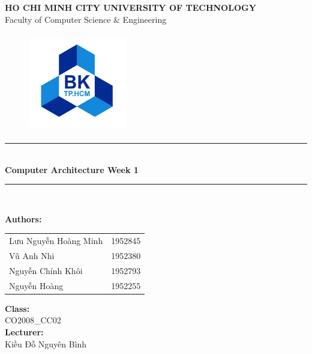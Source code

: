 \documentclass[12pt,a4paper]{article}
\newcommand\HRule{\rule{12cm}{1pt}}
\begin{document}
\begin{titlepage}

  \begin{center}

    \textbf{\fontsize{12pt}{1pt}\selectfont HO CHI MINH CITY UNIVERSITY OF TECHNOLOGY}\\[0.5cm]
    {\fontsize{13pt}{1pt}\selectfont Faculty of Computer Science \& Engineering}\\[0.5cm]
    \begin{figure}[H]
      \centering
      \includegraphics[width=1.7in,height=1.7in]{BK.png}
    \end{figure}

    \HRule\\[0.5cm]
    { \textbf{\fontsize{25pt}{1pt}\selectfont Computer Architecture Week 1}}\\[0.4cm]

    \HRule\\[0.8cm]
    \begin{minipage}{0.545\textwidth}
      \begin{flushleft}
        \textbf{Authors:}\\
        \begin{tabular}{l l}
          Lưu Nguyễn Hoàng Minh & 1952845 \\
          Vũ Anh Nhi            & 1952380 \\
          Nguyễn Chính Khôi     & 1952793 \\
          Nguyễn Hoàng          & 1952255 \\
        \end{tabular}
      \end{flushleft}
    \end{minipage}
    \begin{minipage}{0.4\textwidth}
      \begin{flushright}
        \textbf{Class:}\\
        CO2008\_CC02\\
        \textbf{Lecturer:}\\
        Kiều Đỗ Nguyên Bình\\


\end{flushright}
\end{minipage}
\end{center}
\end{titlepage}
\end{document}
